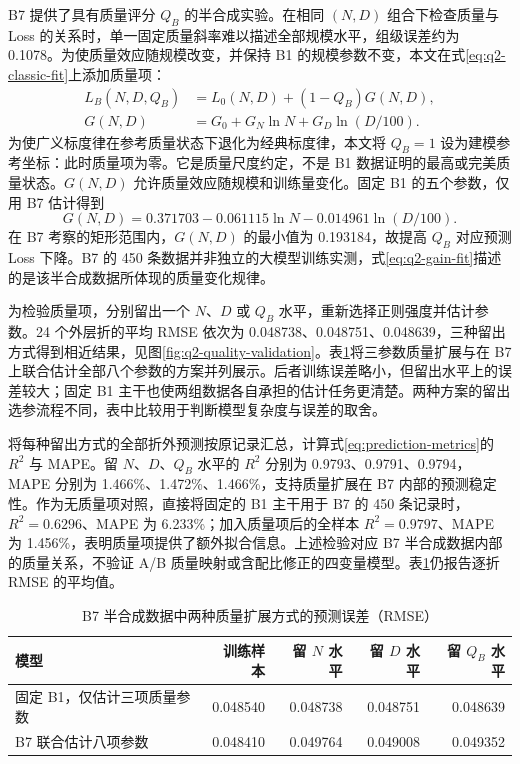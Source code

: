 B7 提供了具有质量评分 $Q_B$ 的半合成实验。在相同 $(N,D)$ 组合下检查质量与 Loss 的关系时，单一固定质量斜率难以描述全部规模水平，组级误差约为 0.1078。为使质量效应随规模改变，并保持 B1 的规模参数不变，本文在式\eqref{eq:q2-classic-fit}上添加质量项：
\begin{align}
 L_B(N,D,Q_B)&=L_0(N,D)+(1-Q_B)G(N,D),\label{eq:q2-quality}\\
 G(N,D)&=G_0+G_N\ln N+G_D\ln(D/100).\label{eq:q2-gain}
\end{align}
为使广义标度律在参考质量状态下退化为经典标度律，本文将 $Q_B=1$ 设为建模参考坐标：此时质量项为零。它是质量尺度约定，不是 B1 数据证明的最高或完美质量状态。$G(N,D)$ 允许质量效应随规模和训练量变化。固定 B1 的五个参数，仅用 B7 估计得到
\begin{equation}
 G(N,D)=0.371703-0.061115\ln N-0.014961\ln(D/100).
 \label{eq:q2-gain-fit}
\end{equation}
在 B7 考察的矩形范围内，$G(N,D)$ 的最小值为 0.193184，故提高 $Q_B$ 对应预测 Loss 下降。B7 的 450 条数据并非独立的大模型训练实测，式\eqref{eq:q2-gain-fit}描述的是该半合成数据所体现的质量变化规律。

为检验质量项，分别留出一个 $N$、$D$ 或 $Q_B$ 水平，重新选择正则强度并估计参数。24 个外层折的平均 RMSE 依次为 0.048738、0.048751、0.048639，三种留出方式得到相近结果，见图\ref{fig:q2-quality-validation}。表\ref{tab:q2-quality-models}将三参数质量扩展与在 B7 上联合估计全部八个参数的方案并列展示。后者训练误差略小，但留出水平上的误差较大；固定 B1 主干也使两组数据各自承担的估计任务更清楚。两种方案的留出选参流程不同，表中比较用于判断模型复杂度与误差的取舍。

将每种留出方式的全部折外预测按原记录汇总，计算式\eqref{eq:prediction-metrics}的 $R^2$ 与 MAPE。留 $N$、$D$、$Q_B$ 水平的 $R^2$ 分别为 0.9793、0.9791、0.9794，MAPE 分别为 1.466\%、1.472\%、1.466\%，支持质量扩展在 B7 内部的预测稳定性。作为无质量项对照，直接将固定的 B1 主干用于 B7 的 450 条记录时，$R^2=0.6296$、MAPE 为 6.233\%；加入质量项后的全样本 $R^2=0.9797$、MAPE 为 1.456\%，表明质量项提供了额外拟合信息。上述检验对应 B7 半合成数据内部的质量关系，不验证 A/B 质量映射或含配比修正的四变量模型。表\ref{tab:q2-quality-models}仍报告逐折 RMSE 的平均值。

\begin{table}[htbp]
 \centering\small
 \caption{B7 半合成数据中两种质量扩展方式的预测误差（RMSE）}
 \label{tab:q2-quality-models}
 \begin{tabular}{lrrrr}
 \toprule
 模型 & 训练样本 & 留 $N$ 水平 & 留 $D$ 水平 & 留 $Q_B$ 水平\\
 \midrule
 固定 B1，仅估计三项质量参数 & 0.048540 & 0.048738 & 0.048751 & 0.048639\\
 B7 联合估计八项参数 & 0.048410 & 0.049764 & 0.049008 & 0.049352\\
 \bottomrule
 \end{tabular}
\end{table}

